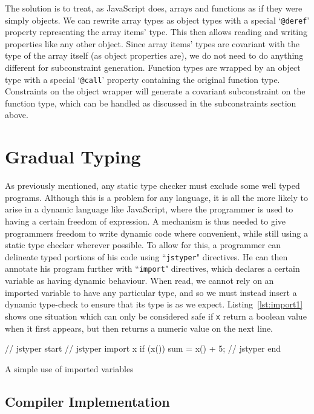 \documentclass[12pt,a4paper,twoside,openright]{report}
\theoremstyle{definition}
\theoremstyle{dotless}
\newcommand*{\js}{\texttt}
\begin{document}
The solution is to treat, as JavaScript does, arrays and functions as if they
were simply objects. We can rewrite array types as object types with a special
`\texttt{@deref}' property representing the array items' type. This then allows
reading and writing properties like any other object. Since array items' types
are covariant with the type of the array itself (as object properties are), we
do not need to do anything different for subconstraint generation. Function
types are wrapped by an object type with a special `\texttt{@call}' property
containing the original function type. Constraints on the object wrapper will
generate a covariant subconstraint on the function type, which can be handled
as discussed in the subconstraints section above.

\section{Gradual Typing}

As previously mentioned, any static type checker must exclude some well typed
programs.  Although this is a problem for any language, it is all the more
likely to arise in a dynamic language like JavaScript, where the programmer is
used to having a certain freedom of expression. A mechanism is thus needed to
give programmers freedom to write dynamic code where convenient, while still
using a static type checker wherever possible. To allow for this, a programmer
can delineate typed portions of his code using ``\js{jstyper}" directives.
He can then annotate his program further with ``\js{import}" directives, which declares a certain
variable as having dynamic behaviour. When read, we cannot rely on an imported
variable to have any particular type, and so we must instead insert a dynamic
type-check to ensure that its type is as we expect.
Listing~\ref{lst:import1} shows one situation which can only be considered safe if
\js{x} return a boolean value when it first appears, but then returns a numeric value on
the next line. 
\begin{listing}
  \begin{jscript}
	// jstyper start
	// jstyper import x
	if (x()) {
	  sum = x() + 5;
	}
	// jstyper end
  \end{jscript}
  \caption{A simple use of imported variables}\label{lst:import1}
\end{listing}

\subsection{Compiler Implementation}
\end{document}
